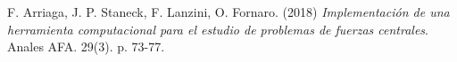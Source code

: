  F. Arriaga, J. P. Staneck, F. Lanzini, O. Fornaro. (2018) \textit{Implementación de una herramienta computacional para el estudio de problemas de fuerzas centrales}. {Anales AFA}. {29(3)}. {p. 73-77}.
